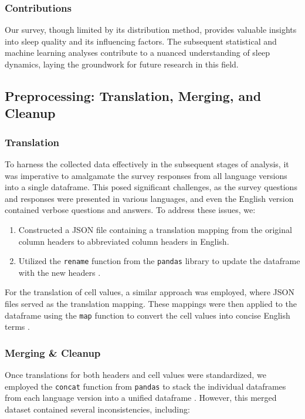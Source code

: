 \documentclass[conference]{IEEEtran}
\begin{document}
\subsubsection*{Contributions}
Our survey, though limited by its distribution method, provides valuable insights into sleep quality and its influencing factors. The subsequent statistical and machine learning analyses contribute to a nuanced understanding of sleep dynamics, laying the groundwork for future research in this field.
\subsection{Preprocessing: Translation, Merging, and Cleanup}
\subsubsection*{Translation}
To harness the collected data effectively in the subsequent stages of analysis, it was imperative to amalgamate the survey responses from all language versions into a single dataframe. This posed significant challenges, as the survey questions and responses were presented in various languages, and even the English version contained verbose questions and answers. To address these issues, we:

\begin{enumerate}
    \item Constructed a JSON file containing a translation mapping from the original column headers to abbreviated column headers in English.
    \item Utilized the \texttt{rename} function from the \texttt{pandas} library to update the dataframe with the new headers \cite{dfrename}.
\end{enumerate}

For the translation of cell values, a similar approach was employed, where JSON files served as the translation mapping. These mappings were then applied to the dataframe using the \texttt{map} function to convert the cell values into concise English terms \cite{dfmap}.

\subsubsection*{Merging \& Cleanup}
Once translations for both headers and cell values were standardized, we employed the \texttt{concat} function from \texttt{pandas} to stack the individual dataframes from each language version into a unified dataframe \cite{pdconcat}. However, this merged dataset contained several inconsistencies, including:
\end{document}
